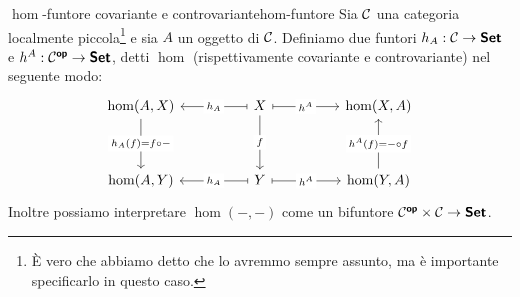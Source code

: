 \documentclass{article}
\renewcommand\C{\mc{C}}
\begin{document}
\begin{definition}{$\hom$-funtore covariante e controvariante}{hom-funtore}
    Sia $\C$ una categoria localmente piccola\footnote{È vero che abbiamo detto che lo avremmo sempre assunto, ma è importante specificarlo in questo caso.} e sia $A$ un oggetto di $\C$. Definiamo due funtori $h_A:\C\to\setcat$ e $h^A : \C^\op\to\setcat$, detti $\hom$ (rispettivamente covariante e controvariante) nel seguente modo:
        \[\begin{tikzcd}
    	{\hom(A,X)} && X && {\hom(X,A)} \\
    	\\
    	{\hom(A,Y)} && Y && {\hom(Y,A)}
    	\arrow["{h_A(f) = f\circ -}"{description}, from=1-1, to=3-1]
    	\arrow["{h_A}"{description}, maps to, from=1-3, to=1-1]
    	\arrow["{h^A}"{description}, maps to, from=1-3, to=1-5]
    	\arrow["f"{description}, from=1-3, to=3-3]
    	\arrow["{h_A}"{description}, maps to, from=3-3, to=3-1]
    	\arrow["{h^A}"{description}, maps to, from=3-3, to=3-5]
	    \arrow["{h^A(f) = -\circ f}"{description}, from=3-5, to=1-5]
    \end{tikzcd}\]
    Inoltre possiamo interpretare $\hom(-,-)$ come un bifuntore $\C^\op\times \C \to \setcat$.
\end{definition}
\end{document}
